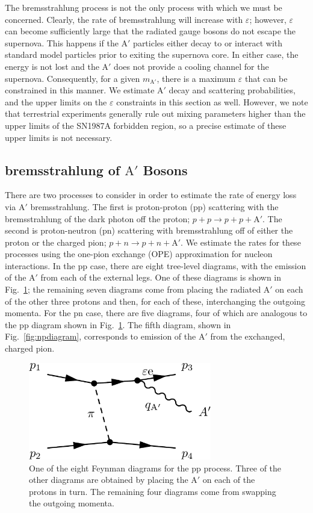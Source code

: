 \documentclass[nofootinbib,prd,superscriptaddress,twocolumn]{revtex4}
\newcommand{\Aprime}{\mathrm{A}'}
\begin{document}
The bremsstrahlung process is not the only process with which we must be concerned. Clearly, the rate of 
bremsstrahlung will increase with $\varepsilon$; however, $\varepsilon$ can become sufficiently large 
that the radiated gauge bosons do not escape the supernova. This happens if the $\Aprime$ particles 
either decay to or interact with standard model particles prior to exiting the supernova core. 
In either case, the energy is not lost and the $\Aprime$ does not provide a cooling channel for the supernova. 
Consequently, for a given $m_{\Aprime}$, there is a maximum $\varepsilon$ that can be constrained in this 
manner. We estimate $\Aprime$ decay and scattering probabilities, and the upper limits on the $\varepsilon$ 
constraints in this section as well. However, we note that terrestrial experiments generally rule out 
mixing parameters higher than the upper limits of the SN1987A forbidden region, so a precise estimate 
of these upper limits is not necessary.

\subsection{bremsstrahlung of $\Aprime$ Bosons}


There are two processes to consider in order to estimate the rate of energy loss via $\Aprime$ bremsstrahlung. The first is  
proton-proton (pp) scattering with the bremsstrahlung of the dark photon off the proton; $p+p \rightarrow p+p+\Aprime$. 
The second is proton-neutron (pn) scattering with bremsstrahlung off of either the proton or the charged pion; 
$p+n \rightarrow p+n+\Aprime$. We estimate the rates for these processes using the one-pion exchange (OPE) 
approximation for nucleon interactions. In the pp case, there are eight tree-level diagrams, 
with the emission of the $\Aprime$ from each of the external legs. One of these diagrams is shown 
in Fig.~\ref{fig:ppdiagram}; the remaining seven diagrams come from placing the radiated $\Aprime$ 
on each of the other three protons and then, for each of these, interchanging the outgoing momenta. 
For the pn case, there are five diagrams, four of which are analogous to the pp diagram shown in 
Fig.~\ref{fig:ppdiagram}. The fifth diagram, shown in Fig.~\ref{fig:npdiagram}, corresponds to 
emission of the $\Aprime$ from the exchanged, charged pion.

\begin{figure}
\includegraphics[width=8cm]{ppdiagram.pdf}
\caption{One of the eight Feynman diagrams for the pp process. Three of the other diagrams are obtained by 
placing the $\Aprime$ on each of the protons in turn. The remaining four diagrams come from swapping the outgoing 
momenta.}
\label{fig:ppdiagram}
\end{figure}
\end{document}
